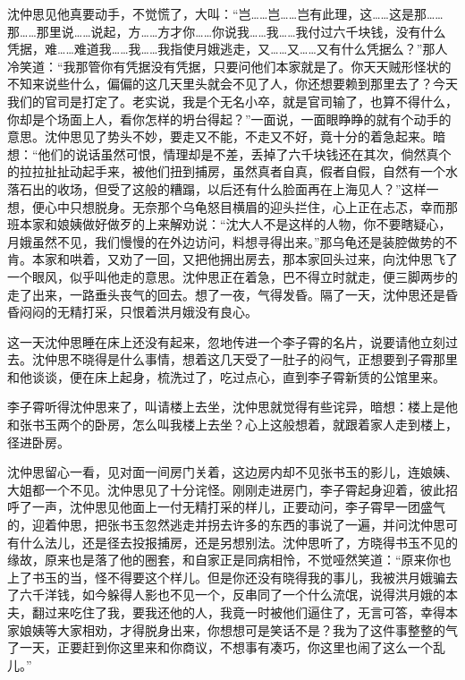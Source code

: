 \documentclass[12pt,UTF8]{ctexbook}
\begin{document}
{{{沈仲思见他真要动手，不觉慌了，大叫：“岂……岂……岂有此理，这……这是那……那……那里说……说起，方……方才你……你说我……我……我付过六千块钱，没有什么凭据，难……难道我……我……我指使月娥逃走，又……又……又有什么凭据么？”那人冷笑道：“我那管你有凭据没有凭据，只要问他们本家就是了。你天天贼形怪状的不知来说些什么，偏偏的这几天里头就会不见了人，你还想要赖到那里去了？今天我们的官司是打定了。老实说，我是个无名小卒，就是官司输了，也算不得什么，你却是个场面上人，看你怎样的坍台得起？”一面说，一面眼睁睁的就有个动手的意思。沈仲思见了势头不妙，要走又不能，不走又不好，竟十分的着急起来。暗想：“他们的说话虽然可恨，情理却是不差，丢掉了六千块钱还在其次，倘然真个的拉拉扯扯动起手来，被他们扭到捕房，虽然真者自真，假者自假，自然有一个水落石出的收场，但受了这般的糟蹋，以后还有什么脸面再在上海见人？”这样一想，便心中只想脱身。无奈那个乌龟怒目横眉的迎头拦住，心上正在忐忑，幸而那班本家和娘姨做好做歹的上来解劝说：“沈大人不是这样的人物，你不要瞎疑心，月娥虽然不见，我们慢慢的在外边访问，料想寻得出来。”那乌龟还是装腔做势的不肯。本家和哄着，又劝了一回，又把他拥出房去，那本家回头过来，向沈仲思飞了一个眼风，似乎叫他走的意思。沈仲思正在着急，巴不得立时就走，便三脚两步的走了出来，一路垂头丧气的回去。想了一夜，气得发昏。隔了一天，沈仲思还是昏昏闷闷的无精打采，只恨着洪月娥没有良心。

这一天沈仲思睡在床上还没有起来，忽地传进一个李子霄的名片，说要请他立刻过去。沈仲思不晓得是什么事情，想着这几天受了一肚子的闷气，正想要到子霄那里和他谈谈，便在床上起身，梳洗过了，吃过点心，直到李子霄新赁的公馆里来。

李子霄听得沈仲思来了，叫请楼上去坐，沈仲思就觉得有些诧异，暗想：楼上是他和张书玉两个的卧房，怎么叫我楼上去坐？心上这般想着，就跟着家人走到楼上，径进卧房。

沈仲思留心一看，见对面一间房门关着，这边房内却不见张书玉的影儿，连娘姨、大姐都一个不见。沈仲思见了十分诧怪。刚刚走进房门，李子霄起身迎着，彼此招呼了一声，沈仲思见他面上一付无精打采的样儿，正要动问，李子霄早一团盛气的，迎着仲思，把张书玉忽然逃走并拐去许多的东西的事说了一遍，并问沈仲思可有什么法儿，还是径去投报捕房，还是另想别法。沈仲思听了，方晓得书玉不见的缘故，原来也是落了他的圈套，和自家正是同病相怜，不觉哑然笑道：“原来你也上了书玉的当，怪不得要这个样儿。但是你还没有晓得我的事儿，我被洪月娥骗去了六千洋钱，如今躲得人影也不见一个，反串同了一个什么流氓，说得洪月娥的本夫，翻过来吃住了我，要我还他的人，我竟一时被他们逼住了，无言可答，幸得本家娘姨等大家相劝，才得脱身出来，你想想可是笑话不是？我为了这件事整整的气了一天，正要赶到你这里来和你商议，不想事有凑巧，你这里也闹了这么一个乱儿。”

}}}
\end{document}
